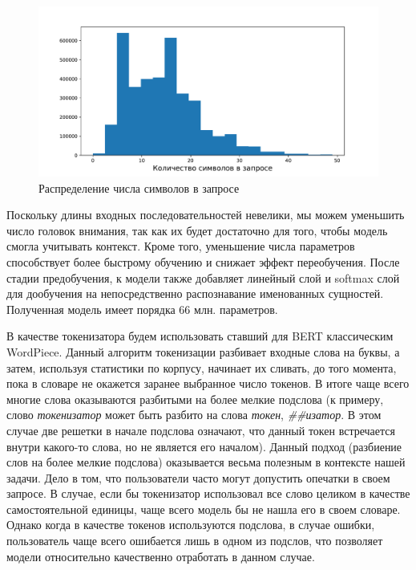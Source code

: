 \documentclass[12pt,a4paper]{article}
\begin{document}
\begin{figure}[H]
	\begin{center}
		\includegraphics[scale=0.4]{nsym.pdf}
	\end{center}
	\caption{Распределение числа символов в запросе}
\end{figure}

\noindent Поскольку длины входных последовательностей невелики, мы можем уменьшить число головок внимания, так как их будет достаточно для того, чтобы модель смогла учитывать контекст. Кроме того, уменьшение числа параметров способствует более быстрому обучению и снижает эффект переобучения. После стадии предобучения, к модели также добавляет линейный слой и softmax слой для дообучения на непосредственно распознавание именованных сущностей. Полученная модель имеет порядка 66 млн. параметров.

В качестве токенизатора будем использовать ставший для BERT классическим WordPiece\cite{wordpiece}. Данный алгоритм токенизации разбивает входные слова на буквы, а затем, используя статистики по корпусу, начинает их сливать, до того момента, пока в словаре не окажется заранее выбранное число токенов. В итоге чаще всего многие слова оказываются разбитыми на более мелкие подслова (к примеру, слово \textit{токенизатор} может быть разбито на слова \textit{токен}, \textit{\#\#изатор}. В этом случае две решетки в начале подслова означают, что данный токен встречается внутри какого-то слова, но не является его началом). Данный подход (разбиение слов на более мелкие подслова) оказывается весьма полезным в контексте нашей задачи. Дело в том, что пользователи часто могут допустить опечатки в своем запросе. В случае, если бы токенизатор использовал все слово целиком в качестве самостоятельной единицы, чаще всего модель бы не нашла его в своем словаре. Однако когда в качестве токенов используются подслова, в случае ошибки, пользователь чаще всего ошибается лишь в одном из подслов, что позволяет модели относительно качественно отработать в данном случае.
\end{document}
